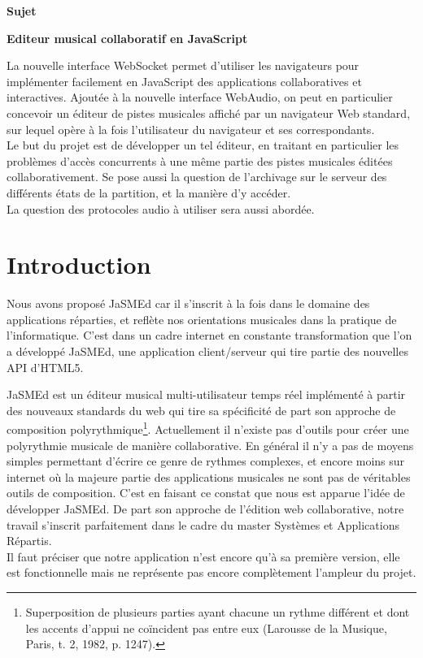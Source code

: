 \documentclass[12pt,a4paper]{article}
\begin{document}



\begin{center}
{\huge \bfseries Sujet}\\[1.5cm]
\end{center}
{\Large \bfseries Editeur musical collaboratif en JavaScript}

\bigskip
La nouvelle interface WebSocket permet d’utiliser les navigateurs pour implémenter facilement en JavaScript des applications collaboratives et interactives. Ajoutée à la nouvelle interface WebAudio, on peut en particulier concevoir un éditeur de pistes musicales affiché par un navigateur Web standard, sur lequel opère à la fois l’utilisateur du navigateur et ses correspondants.\\
Le but du projet est de développer un tel éditeur, en traitant en particulier les problèmes d’accès concurrents à une même partie des pistes musicales éditées collaborativement. Se pose aussi la question de l’archivage sur le serveur des différents états de la partition, et la manière d’y accéder.\\
La question des protocoles audio à utiliser sera aussi abordée.

\vfill

\pagebreak

\tableofcontents

\pagebreak

\section{Introduction}

Nous avons proposé JaSMEd car il s'inscrit à la fois dans le domaine des applications réparties, et reflète nos orientations musicales dans la pratique de l'informatique. C'est dans un cadre internet en constante transformation que l'on a développé JaSMEd, une application client/serveur qui tire partie des nouvelles API d’HTML5.

\medskip
JaSMEd est un éditeur musical multi-utilisateur temps réel implémenté à partir des nouveaux standards du web qui tire sa spécificité de part son approche de composition polyrythmique\footnote{Superposition de plusieurs parties ayant chacune un rythme différent et dont les accents d'appui ne coïncident pas entre eux (Larousse de la Musique, Paris, t. 2, 1982, p. 1247).}. Actuellement il n'existe pas d'outils pour créer une polyrythmie musicale de manière collaborative. En général il n'y a pas de moyens simples permettant d'écrire ce genre de rythmes complexes, et encore moins sur internet où la majeure partie des applications musicales ne sont pas de véritables outils de composition. C'est en faisant ce constat que nous est apparue l'idée de développer JaSMEd. De part son approche de l'édition web collaborative, notre travail s'inscrit parfaitement dans le cadre du master Systèmes et Applications Répartis.\\
Il faut préciser que notre application n’est encore qu’à sa première version, elle est fonctionnelle mais ne représente pas encore complètement l'ampleur du projet.
\end{document}
